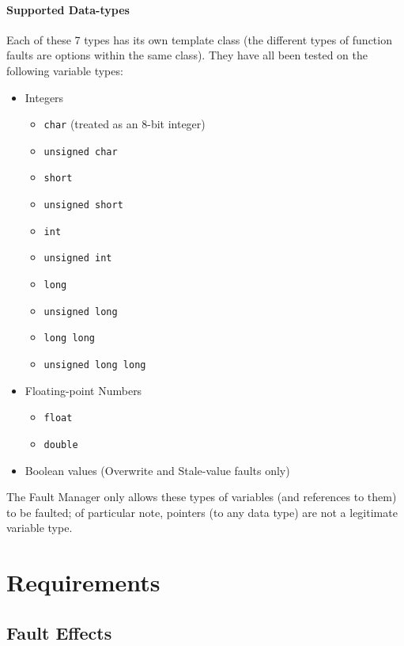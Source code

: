 \documentclass[11pt,fleqn]{report}
\begin{document}
\subsubsection{Supported Data-types}
Each of these 7 types has its own template class (the different types of
function faults are options within the same class).
They have all been tested on the following variable types:
\begin{itemize}
  \item Integers \begin{itemize}
    \item \verb"char" (treated as an 8-bit integer)
    \item \verb"unsigned char"
    \item \verb"short"
    \item \verb"unsigned short"
    \item \verb"int"
    \item \verb"unsigned int"
    \item \verb"long"
    \item \verb"unsigned long"
    \item \verb"long long"
    \item \verb"unsigned long long"
  \end{itemize}
  \item Floating-point Numbers \begin{itemize}
    \item \verb"float"
    \item \verb"double"
  \end{itemize}
  \item Boolean values (Overwrite and Stale-value faults only)
\end{itemize}
The Fault Manager only allows these types of variables (and references to them)
to be faulted; of particular note, pointers (to any data type) are not a
legitimate variable type.






\chapter {Requirements}

\section{Fault Effects}
\end{document}
